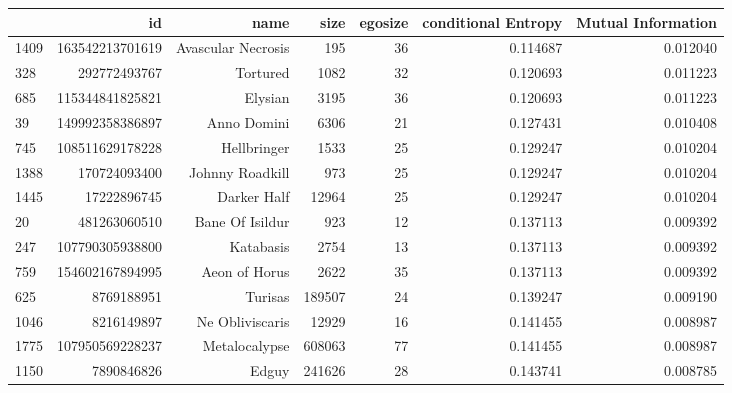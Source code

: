 \begin{table}
\begin{tabular}{| >{\small}l | >{\small}r | >{\small}r | >{\small}r | >{\small}r | >{\small}r |>{\small}r |}
\hline
{} &               id &                      name &    size &  egosize &  conditional Entropy &  Mutual Information \\
\hline
1409 &  163542213701619 &        Avascular Necrosis &     195 &       36 &             0.114687 &            0.012040 \\
328  &     292772493767 &                  Tortured &    1082 &       32 &             0.120693 &            0.011223 \\
685  &  115344841825821 &                   Elysian &    3195 &       36 &             0.120693 &            0.011223 \\
39   &  149992358386897 &               Anno Domini &    6306 &       21 &             0.127431 &            0.010408 \\
745  &  108511629178228 &               Hellbringer &    1533 &       25 &             0.129247 &            0.010204 \\
1388 &     170724093400 &           Johnny Roadkill &     973 &       25 &             0.129247 &            0.010204 \\
1445 &      17222896745 &               Darker Half &   12964 &       25 &             0.129247 &            0.010204 \\
20   &     481263060510 &           Bane Of Isildur &     923 &       12 &             0.137113 &            0.009392 \\
247  &  107790305938800 &                 Katabasis &    2754 &       13 &             0.137113 &            0.009392 \\
759  &  154602167894995 &             Aeon of Horus &    2622 &       35 &             0.137113 &            0.009392 \\
625  &       8769188951 &                   Turisas &  189507 &       24 &             0.139247 &            0.009190 \\
1046 &       8216149897 &           Ne Obliviscaris &   12929 &       16 &             0.141455 &            0.008987 \\
1775 &  107950569228237 &             Metalocalypse &  608063 &       77 &             0.141455 &            0.008987 \\
1150 &       7890846826 &                     Edguy &  241626 &       28 &             0.143741 &            0.008785 \\

\end{tabular}
\end{table}
